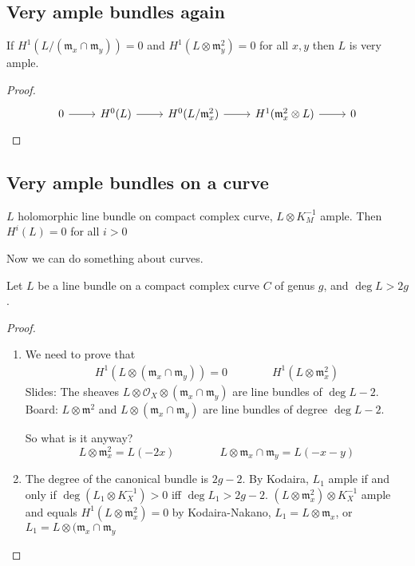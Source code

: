 \subsection{Very ample bundles again}

\begin{coro}\leavevmode
	If $H^{1}(L/(\mathfrak{m}_x\cap \mathfrak{m}_y))=0$ and $H^{1}(L\otimes \mathfrak{m}_y^2)=0$ for all $x,y$ then  $L$ is very ample.
\end{coro}

\begin{proof}\leavevmode
	\[\begin{tikzcd}
		0\arrow[r]&H^{0}(L)\arrow[r]&H^{0}(L/\mathfrak{m}_x^2)\arrow[r]&H^{1}(\mathfrak{m}_x^2\otimes L)\arrow[r]&0
	\end{tikzcd}\]
\end{proof}

\subsection{Very ample bundles on a curve}

\begin{thm}\leavevmode
	$L$ holomorphic line bundle on compact complex curve, $L\otimes K^{-1}_M$ ample. Then $H^{i}(L)=0$ for all $i>0$
\end{thm}
Now we can do something about curves.

\begin{coro}\leavevmode
	Let $L$ be a line bundle on a compact complex curve  $C$ of genus $g$, and $\operatorname{deg}L>2g$.
\end{coro}

\begin{proof}\leavevmode
		\begin{enumerate}[label=\textbf{Step \arabic*}]
		\item We need to prove that
	\begin{align*}
		H^{1}(L\otimes(\mathfrak{m}_x\cap \mathfrak{m}_y))=0\qquad \qquad H^{1}(L\otimes \mathfrak{m}_x^2)
	\end{align*}
	{\color{2}Slides: }The sheaves $L\otimes\mathcal{O}_X\otimes(\mathfrak{m}_x\cap \mathfrak{m}_y)$ are line bundles of $\operatorname{deg}L-2$. {\color{4}Board:} $L\otimes \mathfrak{m}^2$ and $L\otimes(\mathfrak{m}_x\cap \mathfrak{m}_y)$ are line bundles of degree $\operatorname{deg}L-2$.

	So what is it anyway?
	 \[L\otimes \mathfrak{m}_x^2=L(-2x)\qquad \qquad L\otimes \mathfrak{m}_x\cap \mathfrak{m}_y=L(-x-y)\]

	 \item The degree of the canonical bundle is $2g-2$. {\color{6}By Kodaira}, $L_1$ ample if and only if $\operatorname{deg}(L_1\otimes K_X^{-1})>0$ iff $\operatorname{deg}L_1>2g-2$.  $(L\otimes \mathfrak{m}_x^2)\otimes K^{-1}_X$ ample and equals $H^{1}(L\otimes \mathfrak{m}_x^2)=0$ by Kodaira-Nakano, $L_1=L\otimes \mathfrak{m}_x$, or $L_1=L\otimes(\mathfrak{m}_x\cap \mathfrak{m}_y$
	\end{enumerate}
\end{proof}


